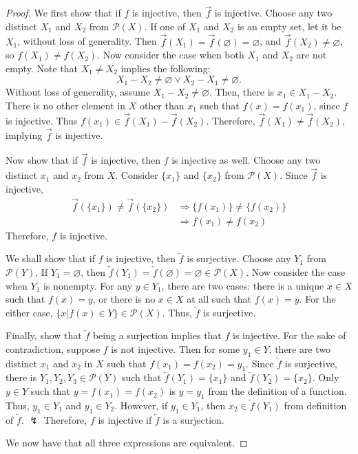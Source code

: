 \documentclass[../main.tex]{subfiles}
\begin{document}
\begin{proof}
    We first show that if $f$ is injective, then $\overrightarrow f$ is injective.
    Choose any two distinct $X_1$ and $X_2$ from $\mathcal{P}(X)$.
    If one of $X_1$ and $X_2$ is an empty set, let it be $X_1$, without loss of generality.
    Then $\overrightarrow{f}(X_1) = \overrightarrow{f}(\varnothing) = \varnothing$, and $\overrightarrow{f}(X_2) \neq \varnothing$, so $f(X_1) \neq f(X_2)$.
    Now consider the case when both $X_1$ and $X_2$ are not empty.
    Note that $X_1 \neq X_2$ implies the following:
    \[
        X_1 - X_2 \neq \varnothing \vee X_2 - X_1 \neq \varnothing.
    \]
    Without loss of generality, assume $X_1 - X_2 \neq \varnothing$.
    Then, there is $x_1 \in X_1 - X_2$.
    There is no other element in $X$ other than $x_1$ such that $f(x) = f(x_1)$, since $f$ is injective.
    Thus $f(x_1) \in \overrightarrow{f}(X_1) - \overrightarrow{f}(X_2)$.
    Therefore, $\overrightarrow{f}(X_1) \neq \overrightarrow{f}(X_2)$, implying $\overrightarrow{f}$ is injective.

    Now show that if $\overrightarrow f$ is injective, then $f$ is injective as well.
    Choose any two distinct $x_1$ and $x_2$ from $X$.
    Consider $\{x_1\}$ and $\{x_2\}$ from $\mathcal{P}(X)$.
    Since $\overrightarrow f$ is injective,
    \begin{align*}
        \overrightarrow{f}(\{x_1\}) \neq \overrightarrow{f}(\{x_2\}) &\Rightarrow \{f(x_1)\} \neq \{f(x_2)\}\\
                                                                     &\Rightarrow f(x_1) \neq f(x_2)
    \end{align*}
    Therefore, $f$ is injective.

    We shall show that if $f$ is injective, then $\overleftarrow{f}$ is surjective.
    Choose any $Y_1$ from $\mathcal{P}(Y)$.
    If $Y_1 = \varnothing$, then $\overleftarrow{f}(Y_1) = \overleftarrow{f}(\varnothing) = \varnothing \in \mathcal{P}(X)$.
    Now consider the case when $Y_1$ is nonempty.
    For any $y \in Y_1$, there are two cases: there is a unique $x \in X$ such that $f(x) = y$, or there is no $x \in X$ at all such that $f(x) = y$.
    For the either case, $\{x | f(x) \in Y\} \in \mathcal{P}(X)$.
    Thus, $\overleftarrow{f}$ is surjective.

    Finally, show that $\overleftarrow{f}$ being a surjection implies that $f$ is injective.
    For the sake of contradiction, suppose $f$ is not injective.
    Then for some $y_1 \in Y$, there are two distinct $x_1$ and $x_2$ in $X$ such that $f(x_1) = f(x_2) = y_1$.
    Since $\overleftarrow{f}$ is surjective, there is $Y_1, Y_2, Y_3 \in \mathcal{P}(Y)$ such that $\overleftarrow{f}(Y_1) = \{x_1\}$ and $\overleftarrow{f}(Y_2) = \{x_2\}$.
    Only $y \in Y$ such that $y = f(x_1) = f(x_2)$ is $y = y_1$ from the definition of a function.
    Thus, $y_1 \in Y_1$ and $y_1 \in Y_2$.
    However, if $y_1 \in Y_1$, then $x_2 \in \overleftarrow{f}(Y_1)$ from definition of $\overleftarrow{f}$. $\lightning$
    Therefore, $f$ is injective if $\overleftarrow{f}$ is a surjection.

    We now have that all three expressions are equivalent.
\end{proof}
\end{document}
